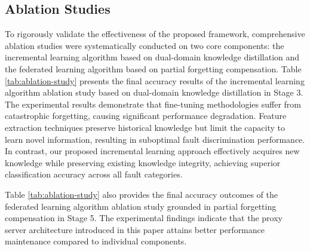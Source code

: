 \subsection{Ablation Studies}
To rigorously validate the effectiveness of the proposed framework, 
comprehensive ablation studies were systematically conducted on two core components:
the incremental learning algorithm based on dual-domain knowledge distillation 
and the federated learning algorithm based on partial forgetting compensation. 
Table \ref{tab:ablation-study} presents the final accuracy results 
of the incremental learning algorithm ablation study based on dual-domain knowledge distillation in Stage 3. 
The experimental results demonstrate that fine-tuning methodologies suffer from catastrophic forgetting, 
causing significant performance degradation.
Feature extraction techniques preserve historical knowledge but limit the capacity to learn novel information, 
resulting in suboptimal fault discrimination performance. 
In contrast, our proposed incremental learning approach effectively acquires new knowledge 
while preserving existing knowledge integrity, 
achieving superior classification accuracy across all fault categories.

\begin{table}[t]
\caption{Ablation study for federated learning components}
\centering
\label{tab:ablation-study}
\end{table}

Table \ref{tab:ablation-study} also provides the final accuracy outcomes 
of the federated learning algorithm ablation study grounded in partial forgetting compensation in Stage 5. 
The experimental findings indicate that the proxy server architecture introduced in this paper 
attains better performance maintenance compared to individual components.

